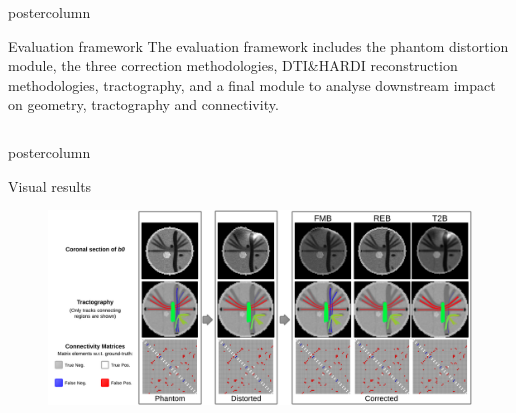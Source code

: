 \documentclass[final,hyperref={pdfpagelabels=false}]{beamer}
\newlength{\columnheight}
\begin{document}
\begin{frame}[t]
{\begin{minipage}[t][\columnheight][c]{0.95\textwidth}
{\begin{columns}[T,totalwidth=\textwidth]
\begin{column}{.64\linewidth}
\begin{beamercolorbox}[center,wd=\textwidth]{postercolumn}
\begin{minipage}[T]{.95\textwidth}
{\begin{block}{Evaluation framework}
          The evaluation framework includes the phantom distortion module, the three correction
          methodologies, DTI\&HARDI reconstruction methodologies, tractography,
          and a final module to analyse downstream impact on geometry, tractography and connectivity.
          \end{block}
          }
        \end{minipage}
      \end{beamercolorbox}
    \end{column}
  \end{columns}
  \noindent
  \vfill
      \begin{beamercolorbox}[wd=\textwidth]{postercolumn}
        \begin{minipage}[T]{\textwidth} %
          \parbox[t]{\textwidth}{ %
            \begin{block}{Visual results}
              \begin{figure}
                 \centering
                 \includegraphics[width=\textwidth]{Fig02-Results}
              \end{figure}
            \end{block}
            }
        \end{minipage}
      \end{beamercolorbox}
  \vfill
  \begin{columns}[T,totalwidth=\textwidth]
    \begin{column}{.34\textwidth}

\end{column}
\end{columns}}
\end{minipage}}
\end{frame}
\end{document}

